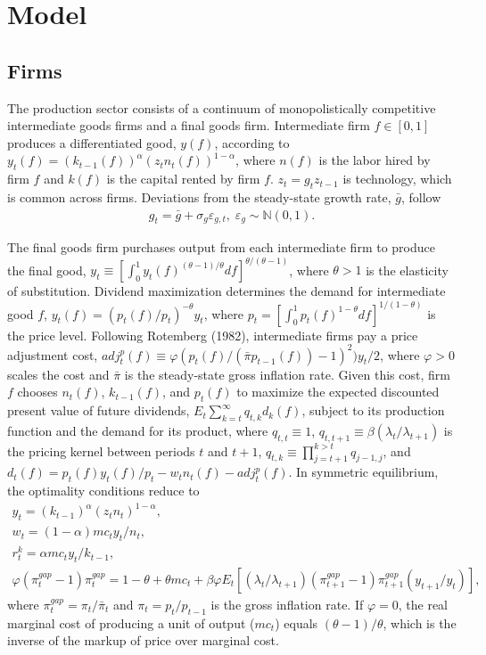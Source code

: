 \documentclass[12pt, final]{article}
\begin{document}
\section{Model}
\subsection{Firms} The production sector consists of a continuum of monopolistically competitive intermediate goods firms and a final goods firm. Intermediate firm $f \in [0,1]$ produces a differentiated good, $y(f)$, according to $y_t(f) = (k_{t-1}(f))^\alpha(z_tn_t(f))^{1-\alpha}$, where $n(f)$ is the labor hired by firm $f$ and $k(f)$ is the capital rented by firm $f$. $z_t = g_tz_{t-1}$ is technology, which is common across firms. Deviations from the steady-state growth rate, $\bar{g}$, follow
\begin{gather}
  \label{eq:1}
  g_t = \bar{g} + \sigma_g\varepsilon_{g,t},\; \varepsilon_g \sim \mathds{N}(0,1). 
\end{gather}

The final goods firm purchases output from each intermediate firm to produce the final good, $y_t \equiv [\int_{0}^1 y_t(f)^{(\theta-1)/\theta}df]^{\theta/(\theta-1)}$, where $\theta > 1$ is the elasticity of substitution. Dividend maximization determines the demand for intermediate good $f$, $y_t(f) = (p_t(f)/p_t)^{-\theta}y_t$, where $p_t = [\int_{0}^{1} p_t(f)^{1-\theta}df]^{1/(1-\theta)}$ is the price level. Following Rotemberg (1982), intermediate firms pay a price adjustment cost, $adj_t^p(f) \equiv \varphi(p_t(f)/(\bar{\pi}p_{t-1}(f))-1)^2)y_t/2$, where $\varphi > 0$ scales the cost and $\bar{\pi}$ is the steady-state gross inflation rate. Given this cost, firm $f$ chooses $n_t(f)$, $k_{t-1}(f)$, and $p_t(f)$ to maximize the expected discounted present value of future dividends, $E_t\sum_{k=t}^\infty q_{t,k}d_k(f)$, subject to its production function and the demand for its product, where $q_{t,t} \equiv 1$, $q_{t,t+1} \equiv \beta(\lambda_t/\lambda_{t+1})$ is the pricing kernel between periods $t$ and $t+1$, $q_{t,k} \equiv \prod_{j=t+1}^{k>t} q_{j-1,j}$, and $d_t(f) = p_t(f)y_t(f)/p_t - w_tn_t(f) - adj_t^p(f)$. In symmetric equilibrium, the optimality conditions reduce to
\begin{gather}
  y_t = (k_{t-1})^\alpha(z_tn_t)^{1-\alpha},\\
  w_t = (1-\alpha)mc_ty_t/n_t,\\
  r_t^k = \alpha mc_t y_t/k_{t-1},\\
  \varphi(\pi_t^{gap}-1)\pi_t^{gap} = 1-\theta + \theta mc_t + \beta\varphi E_t[(\lambda_t/\lambda_{t+1})(\pi_{t+1}^{gap}-1)\pi_{t+1}^{gap}(y_{t+1}/y_t)],
\end{gather}
where $\pi^{gap}_t = \pi_t/\bar{\pi}_t$ and $\pi_t = p_t/p_{t-1}$ is the gross inflation rate. If $\varphi = 0$, the real marginal cost of producing a unit of output ($mc_t$) equals $(\theta-1)/\theta$, which is the inverse of the markup of price over marginal cost.
\end{document}
